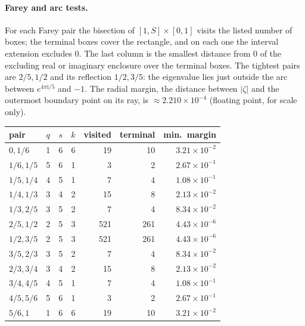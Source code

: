 \documentclass[11pt,a4paper]{article}
\numberwithin{equation}{section}
\theoremstyle{definition}
\theoremstyle{remark}
\newcommand{\ii}{\mathrm{i}}
\begin{document}
\paragraph{Farey and arc tests.} For each Farey pair the bisection of \([1,S]\times[0,1]\) visits the listed number of boxes; the terminal boxes cover the rectangle, and on each one the interval extension excludes 0. The last column is the smallest distance from 0 of the excluding real or imaginary enclosure over the terminal boxes. The tightest pairs are \(2/5,1/2\) and its reflection \(1/2,3/5\): the eigenvalue lies just outside the arc between \(e^{4\pi\ii/5}\) and \(-1\). The radial margin, the distance between \(|\zeta|\) and the outermost boundary point on its ray, is \(\approx2.210\times10^{-4}\) (floating point, for scale only).
\begin{center}\small
\begin{tabular}{@{}lcccrrr@{}}
\toprule
pair & \(q\) & \(s\) & \(k\) & visited & terminal & min.\ margin\\
\midrule
\(0,1/6\) & 1 & 6 & 6 & 19 & 10 & \(3.21\times10^{-2}\)\\
\(1/6,1/5\) & 5 & 6 & 1 & 3 & 2 & \(2.67\times10^{-1}\)\\
\(1/5,1/4\) & 4 & 5 & 1 & 7 & 4 & \(1.08\times10^{-1}\)\\
\(1/4,1/3\) & 3 & 4 & 2 & 15 & 8 & \(2.13\times10^{-2}\)\\
\(1/3,2/5\) & 3 & 5 & 2 & 7 & 4 & \(8.34\times10^{-2}\)\\
\(2/5,1/2\) & 2 & 5 & 3 & 521 & 261 & \(4.43\times10^{-6}\)\\
\(1/2,3/5\) & 2 & 5 & 3 & 521 & 261 & \(4.43\times10^{-6}\)\\
\(3/5,2/3\) & 3 & 5 & 2 & 7 & 4 & \(8.34\times10^{-2}\)\\
\(2/3,3/4\) & 3 & 4 & 2 & 15 & 8 & \(2.13\times10^{-2}\)\\
\(3/4,4/5\) & 4 & 5 & 1 & 7 & 4 & \(1.08\times10^{-1}\)\\
\(4/5,5/6\) & 5 & 6 & 1 & 3 & 2 & \(2.67\times10^{-1}\)\\
\(5/6,1\) & 1 & 6 & 6 & 19 & 10 & \(3.21\times10^{-2}\)\\
\bottomrule
\end{tabular}
\end{center}
\end{document}

